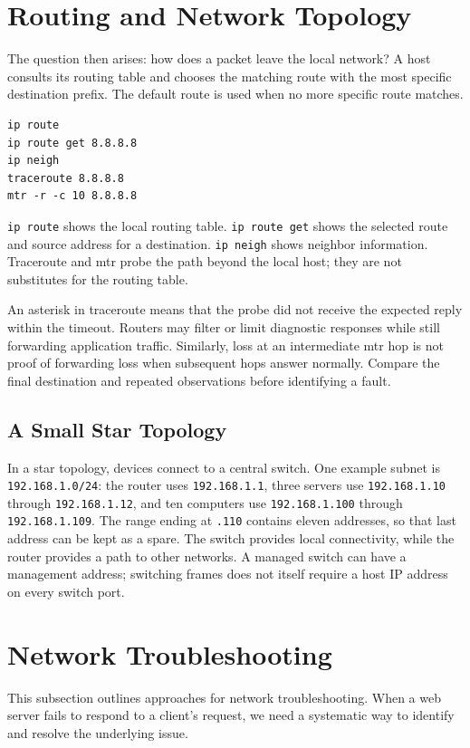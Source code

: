 \documentclass[journal]{IEEEtran}
\begin{document}
\section{Routing and Network Topology}
The question then arises: how does a packet leave the local network? A host consults its routing table and chooses the matching route with the most specific destination prefix. The default route is used when no more specific route matches.
\begin{lstlisting}
ip route
ip route get 8.8.8.8
ip neigh
traceroute 8.8.8.8
mtr -r -c 10 8.8.8.8
\end{lstlisting}
\texttt{ip route} shows the local routing table. \texttt{ip route get} shows the selected route and source address for a destination. \texttt{ip neigh} shows neighbor information. Traceroute and mtr probe the path beyond the local host; they are not substitutes for the routing table.

An asterisk in traceroute means that the probe did not receive the expected reply within the timeout. Routers may filter or limit diagnostic responses while still forwarding application traffic. Similarly, loss at an intermediate mtr hop is not proof of forwarding loss when subsequent hops answer normally. Compare the final destination and repeated observations before identifying a fault.

\subsection{A Small Star Topology}
In a star topology, devices connect to a central switch. One example subnet is \texttt{192.168.1.0/24}: the router uses \texttt{192.168.1.1}, three servers use \texttt{192.168.1.10} through \texttt{192.168.1.12}, and ten computers use \texttt{192.168.1.100} through \texttt{192.168.1.109}. The range ending at \texttt{.110} contains eleven addresses, so that last address can be kept as a spare. The switch provides local connectivity, while the router provides a path to other networks. A managed switch can have a management address; switching frames does not itself require a host IP address on every switch port.

\section{Network Troubleshooting}


This subsection outlines approaches for network troubleshooting. When a web server fails to respond to a client's request, we need a systematic way to identify and resolve the underlying issue.
\end{document}
